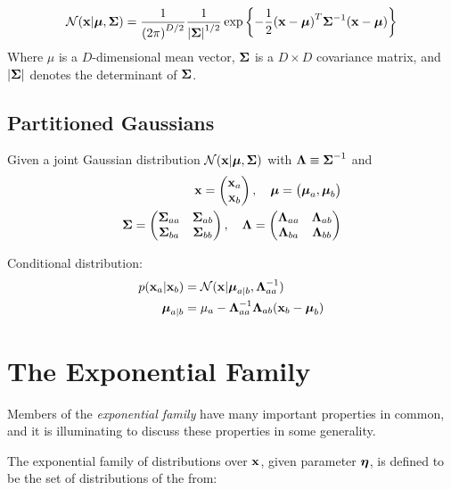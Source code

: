\begin{equation}
    \mathcal{N}(\mathbf{x}|\boldsymbol\mu, \boldsymbol\Sigma) = \frac{1}{{(2\pi)}^{D/2}}
    \frac{1}{{|\boldsymbol\Sigma|}^{1/2}} \exp\left\{ -\frac{1}{2} {(\mathbf{x} -
    \boldsymbol\mu)}^T\boldsymbol\Sigma^{-1}(\mathbf{x} - \boldsymbol\mu) \right\} 
    \label{gaussian}
\end{equation}
Where $\mu$ is a $D$-dimensional mean vector, $\boldsymbol\Sigma$ is a $D \times D$
covariance matrix, and $|\boldsymbol\Sigma|$ denotes the determinant of $\boldsymbol\Sigma$.

\subsection{Partitioned Gaussians}
Given a joint Gaussian distribution $\mathcal{N}(\mathbf{x}|\boldsymbol\mu, \boldsymbol\Sigma)$ with
$\boldsymbol\Lambda \equiv \boldsymbol\Sigma^{-1}$ and 
\begin{align}
    \mathbf{x} = \begin{pmatrix}\mathbf{x}_a \\ \mathbf{x}_b \end{pmatrix}, \quad \boldsymbol\mu =
    \begin{pmatrix}\boldsymbol\mu_a, \boldsymbol\mu_b
    \end{pmatrix} \\
    \boldsymbol\Sigma = \begin{pmatrix}\boldsymbol\Sigma_{aa} & \boldsymbol\Sigma_{ab} \\ \boldsymbol\Sigma_{ba} &
        \boldsymbol\Sigma_{bb} \end{pmatrix} , \quad 
    \boldsymbol\Lambda = \begin{pmatrix} \boldsymbol\Lambda_{aa} & \boldsymbol\Lambda_{ab} \\ \boldsymbol\Lambda_{ba} &
        \boldsymbol\Lambda_{bb} \end{pmatrix}
\end{align}

Conditional distribution:
\begin{align}
    p(\mathbf{x}_a|\mathbf{x}_b) &= \mathcal{N}(\mathbf{x}|\boldsymbol\mu_{a|b}, \boldsymbol\Lambda^{-1}_{aa}) \\
    \boldsymbol\mu_{a|b} &= \mu_a - \boldsymbol\Lambda^{-1}_{aa}\boldsymbol\Lambda_{ab}(\mathbf{x}_b -
    \boldsymbol\mu_{b})
\end{align}

\section{The Exponential Family}
Members of the \emph{exponential family} have many important properties in
common, and it is illuminating to discuss these properties in some
generality.

The exponential family of distributions over $\mathbf{x}$, given parameter
$\boldsymbol\eta$, is defined to be the set of distributions of the from:


